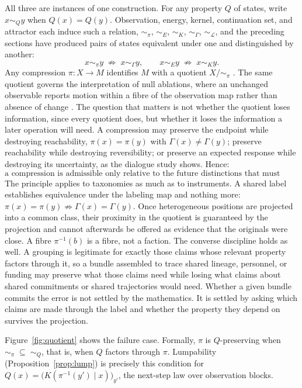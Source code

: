 \documentclass[11pt]{article}
\theoremstyle{definition}
\theoremstyle{remark}
\begin{document}
All three are instances of one construction. For any property $Q$ of states, write $x \sim_Q y$ when $Q(x) = Q(y)$. Observation, energy, kernel, continuation set, and attractor each induce such a relation, $\sim_\pi$, $\sim_E$, $\sim_K$, $\sim_\Gamma$, $\sim_{\mathcal{L}}$, and the preceding sections have produced pairs of states equivalent under one and distinguished by another:
\begin{equation}
x \sim_\pi y \;\not\Rightarrow\; x \sim_\Gamma y, \qquad x \sim_E y \;\not\Rightarrow\; x \sim_K y .
\end{equation}
Any compression $\pi : X \to M$ identifies $M$ with a quotient $X / {\sim_\pi}$ \cite{flyxion-clipboard}. The same quotient governs the interpretation of null ablations, where an unchanged observable reports motion within a fibre of the observation map rather than absence of change \cite{flyxion-ablation}. The question that matters is not whether the quotient loses information, since every quotient does, but whether it loses the information a later operation will need. A compression may preserve the endpoint while destroying reachability, $\pi(x) = \pi(y)$ with $\Gamma(x) \neq \Gamma(y)$; preserve reachability while destroying reversibility; or preserve an expected response while destroying its uncertainty, as the dialogue study shows. Hence:
\begin{equation}
\boxed{\text{a compression is admissible only relative to the future distinctions that must survive it.}}
\end{equation}
The principle applies to taxonomies as much as to instruments. A shared label establishes equivalence under the labeling map and nothing more: $\pi(x) = \pi(y) \not\Rightarrow \Gamma(x) = \Gamma(y)$. Once heterogeneous positions are projected into a common class, their proximity in the quotient is guaranteed by the projection and cannot afterwards be offered as evidence that the originals were close. A fibre $\pi^{-1}(b)$ is a fibre, not a faction. The converse discipline holds as well. A grouping is legitimate for exactly those claims whose relevant property factors through it, so a bundle assembled to trace shared lineage, personnel, or funding may preserve what those claims need while losing what claims about shared commitments or shared trajectories would need. Whether a given bundle commits the error is not settled by the mathematics. It is settled by asking which claims are made through the label and whether the property they depend on survives the projection.

Figure~\ref{fig:quotient} shows the failure case. Formally, $\pi$ is $Q$-preserving when $\sim_\pi \;\subseteq\; \sim_Q$, that is, when $Q$ factors through $\pi$. Lumpability (Proposition~\ref{prop:lump}) is precisely this condition for $Q(x) = \big(K(\pi^{-1}(y') \mid x)\big)_{y'}$, the next-step law over observation blocks.
\end{document}
